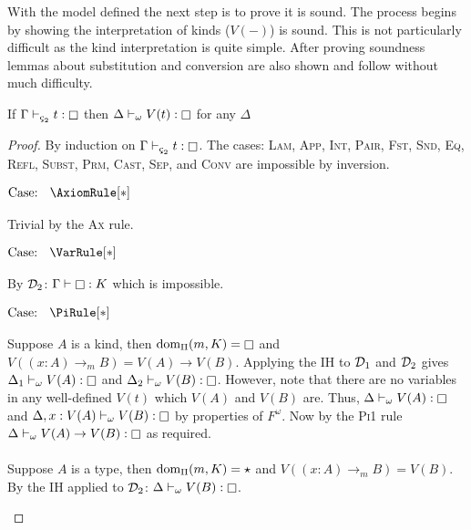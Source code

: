 With the model defined the next step is to prove it is sound.
The process begins by showing the interpretation of kinds ($V(-)$) is sound.
This is not particularly difficult as the kind interpretation is quite simple.
After proving soundness lemmas about substitution and conversion are also shown and follow without much difficulty.

\begin{theorem}[Soundness of $V$]
    \label{lem:3:soudness_of_v}
    If $\Gamma \vdash_{\ced} t : \kind$ then $\Delta \vdash_\omega V(t) : \kind$ for any $\Delta$
\end{theorem}
\begin{proof}
    By induction on $\Gamma \vdash_{\ced} t : \kind$.
    The cases: \textsc{Lam}, \textsc{App}, \textsc{Int}, \textsc{Pair}, \textsc{Fst}, \textsc{Snd}, \textsc{Eq}, \textsc{Refl}, \textsc{Subst}, \textsc{Prm}, \textsc{Cast}, \textsc{Sep}, and \textsc{Conv} are impossible by inversion.

    $\text{Case: }\begin{array}{c} \AxiomRule[*] \end{array}$
    \begin{proofcase}
        Trivial by the \textsc{Ax} rule.
    \end{proofcase}

    $\text{Case: }\begin{array}{c} \VarRule[*] \end{array}$
    \begin{proofcase}
        By $\mathcal{D}_{2}$: $\Gamma \vdash \kind : K$ which is impossible.
    \end{proofcase}

    $\text{Case: }\begin{array}{c} \PiRule[*] \end{array}$
    \begin{proofcase}
        Suppose $A$ is a kind, then $\pdom(m, K) = \kind$ and $V((x : A) \to_m B) = V(A) \to V(B)$.
        Applying the IH to $\mathcal{D}_{1}$ and $\mathcal{D}_{2}$ gives $\Delta_1 \vdash_\omega V(A) : \kind$ and $\Delta_2 \vdash_\omega V(B) : \kind$.
        However, note that there are no variables in any well-defined $V(t)$ which $V(A)$ and $V(B)$ are.
        Thus, $\Delta \vdash_\omega V(A) : \kind$ and $\Delta, x : V(A) \vdash_\omega V(B) : \kind$ by properties of $F^\omega$.
        Now by the \textsc{Pi1} rule $\Delta \vdash_\omega V(A) \to V(B) : \kind$ as required.
        \\ \\
        Suppose $A$ is a type, then $\textnormal{dom}_\Pi(m, K) = \star$ and $V((x : A) \to_m B) = V(B)$.
        By the IH applied to $\mathcal{D}_{2}$: $\Delta \vdash_\omega V(B) : \kind$.
    \end{proofcase}
\end{proof}

